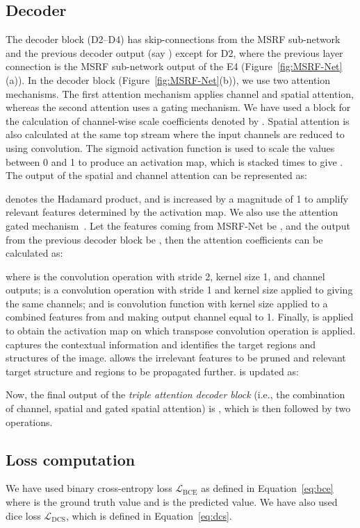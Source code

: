 \documentclass[journal,twoside,web]{IEEEtran}
\newcommand{\loss}{\ensuremath{\mathcal{L}}}
\newcommand{\lbce}{\ensuremath{\loss_\text{BCE}}\xspace}
\newcommand{\ldcs}{\ensuremath{\loss_\text{DCS}}\xspace}
\begin{document}
\subsection{Decoder}
The decoder block (D2--D4) has skip-connections from the MSRF sub-network and the previous decoder output (say ) except for D2, where the previous layer connection is the MSRF sub-network output of the E4 (Figure~\ref{fig:MSRF-Net}(a)).
In the decoder block (Figure~\ref{fig:MSRF-Net}(b)), we use two attention mechanisms. The first attention mechanism applies channel and spatial attention, whereas the second attention uses a gating mechanism. We have used a   block for the calculation of channel-wise scale coefficients denoted by . Spatial attention is also calculated at the same top stream where the input channels  are reduced to  using  convolution. The sigmoid activation function  is used to scale the values between 0 and 1 to produce an activation map, which is stacked  times to give . The output of the spatial and channel attention can be represented as:

  denotes the Hadamard product, and  is increased by a magnitude of 1 to amplify relevant features determined by the activation map. We also use the attention gated mechanism~\cite{oktay2018attention}. Let the features coming from MSRF-Net be , and the output from the previous decoder block be , then the attention coefficients can be calculated as:

where  is the convolution operation with stride 2, kernel size 1, and  channel outputs;
 is a convolution operation with stride 1 and kernel size  applied to  giving the same  channels; and
 is convolution function with  kernel size applied to a combined features from  and  making output channel equal to 1. Finally,  is applied to obtain the activation map on which transpose convolution operation  is applied.  captures the contextual information and identifies the target regions and structures of the image.  allows the irrelevant features to be pruned and relevant target structure and regions to be propagated further.  is updated as:

Now, the final output of the \textit{triple attention decoder block} (i.e., the combination of channel, spatial and gated spatial attention) is , which is then followed by two  operations. 

\subsection{Loss computation}
\label{section:loss_comp}
We have used binary cross-entropy loss \lbce  as defined in Equation~\ref{eq:bce} where  is the ground truth value and  is the predicted value. We have also used dice loss \ldcs, which is defined in Equation~\ref{eq:dcs}. 
\end{document}
